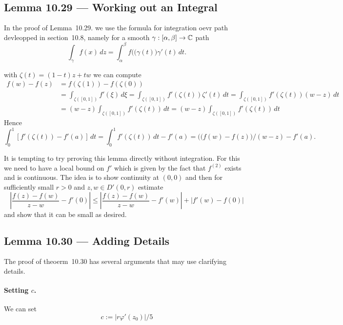 \subsection{Lemma 10.29 --- Working out an Integral}

In the proof of Lemma~10.29.
we use the formula for integration oevr path devleopped
in section~10.8, namely for a smooth \(\gamma:[\alpha,\beta]\to\mathbb{C}\) path
\begin{equation*}
\int_\gamma f(x)\,dz = \int_\alpha^\beta f(\bigl(\gamma(t)\bigr)\gamma'(t)\,dt.
\end{equation*}

with \(\zeta(t) = (1-t)z+tw\) we can compute
\begin{align*}
f(w) - f(z)
&= f(\zeta(1)) - f(\zeta(0)) \\
&= \int_{\zeta([0,1])} f'(\xi)\,d\xi
 = \int_{\zeta([0,1])} f'(\zeta(t))\zeta'(t)\,dt
 = \int_{\zeta([0,1])} f'(\zeta(t))(w-z)\,dt \\
&= (w-z)\int_{\zeta([0,1])} f'(\zeta(t))\,dt
 = (w-z)\int_{\zeta([0,1])} f'(\zeta(t))\,dt
\end{align*}
Hence
\begin{equation*}
\int_0^1 \left[f'(\zeta(t)) - f'(a)\right]\,dt
= \int_0^1 f'(\zeta(t))\,dt - f'(a)
= \bigl((f(w) - f(z)\bigr)/(w-z) - f'(a).
\end{equation*}

It is tempting to try prroving this lemma directly without integration.
For this we need to have a local bound on \(f'\) which is given
by the fact that \(f^{(2)}\) exists and is continuous.
The idea is to show continuity at \((0,0)\) and then for sufficiently small
\(r>0\) and \(z,w\in D'(0,r)\) estimate
\begin{equation*}
\left|\frac{f(z)-f(w)}{z-w} - f'(0)\right|
\leq \left|\frac{f(z)-f(w)}{z-w} - f'(w)\right| + |f'(w) - f(0)|
\end{equation*}
and show that it can be small as desired.

\subsection{Lemma 10.30 --- Adding Details}

The proof of theoerm~10.30 has several arguments that may use
clarifying details.

\paragraph{Setting $c$.} We can set
\begin{equation*}
c := \left|r\varphi'(z_0)\right|/5
\end{equation*}

